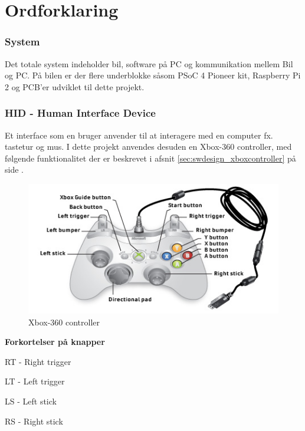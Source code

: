 
\section{Ordforklaring} \label{sec:ordforklaring}

\subsubsection{System}
Det totale system indeholder bil, software på PC og kommunikation mellem Bil og PC. På bilen er der flere underblokke såsom PSoC 4 Pioneer kit, Raspberry Pi 2 og PCB'er udviklet til dette projekt.

\subsubsection{HID - Human Interface Device}
Et interface som en bruger anvender til at interagere med en computer fx. tastetur og mus. I dette projekt anvendes desuden en Xbox-360 controller, med følgende funktionalitet der er beskrevet i afsnit \ref{sec:swdesign_xboxcontroller}  på side \pageref{sec:swdesign_xboxcontroller}.

\begin{figure}[h]
	\centering
	\includegraphics[width=\textwidth*4/5]{../fig/billeder/Wired-controller-callouts.jpg}
	\caption{Xbox-360 controller \cite{lib:xboxcontroller}}
	\label{fig:xboxcontroller}
\end{figure}

\textbf{Forkortelser på knapper}
\begin{packed_item}
	\item RT - Right trigger
	\item LT - Left trigger 
	\item LS - Left stick
	\item RS - Right stick
\end{packed_item}

